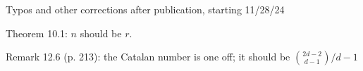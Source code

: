 Typos and other corrections after publication, starting 11/28/24

Theorem 10.1: $n$ should be $r$.

Remark 12.6 (p. 213): the Catalan number is one off; it should be $\binom{2d-2}{d-1}/d-1$

